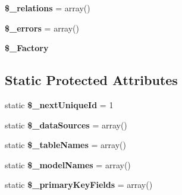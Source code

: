 \begin{DoxyCompactItemize}
\item 
\hypertarget{classModel_a1334a3f8cf937df309133e627a0cfc49}{
{\bfseries \$\_\-relations} = array()}
\label{classModel_a1334a3f8cf937df309133e627a0cfc49}

\item 
\hypertarget{classModel_a35a792dbdd1d8a5b52f0da0421a402d6}{
{\bfseries \$\_\-errors} = array()}
\label{classModel_a35a792dbdd1d8a5b52f0da0421a402d6}

\item 
\hypertarget{classModel_ad41f5bede8f7fcc307a12b6b64e4e894}{
{\bfseries \$\_\-Factory}}
\label{classModel_ad41f5bede8f7fcc307a12b6b64e4e894}

\end{DoxyCompactItemize}
\subsection*{Static Protected Attributes}
\begin{DoxyCompactItemize}
\item 
\hypertarget{classModel_aa96d314eb5f4c73e0bda8ea174e19664}{
static {\bfseries \$\_\-nextUniqueId} = 1}
\label{classModel_aa96d314eb5f4c73e0bda8ea174e19664}

\item 
\hypertarget{classModel_a8108a929e478a7d7a8e9ec6fac8a9fb6}{
static {\bfseries \$\_\-dataSources} = array()}
\label{classModel_a8108a929e478a7d7a8e9ec6fac8a9fb6}

\item 
\hypertarget{classModel_afedcdc26523874d393f219f1829f32f3}{
static {\bfseries \$\_\-tableNames} = array()}
\label{classModel_afedcdc26523874d393f219f1829f32f3}

\item 
\hypertarget{classModel_ae0caed3ad9c0a9f8a7318dca3815884e}{
static {\bfseries \$\_\-modelNames} = array()}
\label{classModel_ae0caed3ad9c0a9f8a7318dca3815884e}

\item 
\hypertarget{classModel_aaee3dd75fc8e3ba62e9ee329dd06cd6b}{
static {\bfseries \$\_\-primaryKeyFields} = array()}
\label{classModel_aaee3dd75fc8e3ba62e9ee329dd06cd6b}

\end{DoxyCompactItemize}


